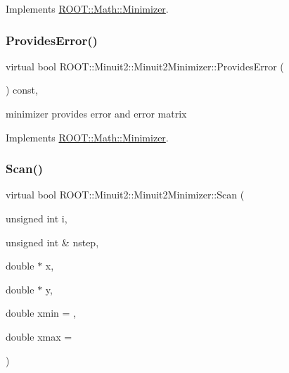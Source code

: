 Implements \mbox{\hyperlink{classROOT_1_1Math_1_1Minimizer_a71837caa295c76303c1a14679be1898d}{R\+O\+O\+T\+::\+Math\+::\+Minimizer}}.

\mbox{\label{classROOT_1_1Minuit2_1_1Minuit2Minimizer_a3a3a8abea38285fe639f2f0ec5505533}} 
\subsubsection{\texorpdfstring{ProvidesError()}{ProvidesError()}\hspace{0.1cm}{\footnotesize\ttfamily [3/3]}}
{\footnotesize\ttfamily virtual bool R\+O\+O\+T\+::\+Minuit2\+::\+Minuit2\+Minimizer\+::\+Provides\+Error (\begin{DoxyParamCaption}{ }\end{DoxyParamCaption}) const\hspace{0.3cm}{\ttfamily [inline]}, {\ttfamily [virtual]}}



minimizer provides error and error matrix 



Implements \mbox{\hyperlink{classROOT_1_1Math_1_1Minimizer_a71837caa295c76303c1a14679be1898d}{R\+O\+O\+T\+::\+Math\+::\+Minimizer}}.

\mbox{\label{classROOT_1_1Minuit2_1_1Minuit2Minimizer_a3f2f94c743a9b120a71da5ba23bd88cb}} 
\subsubsection{\texorpdfstring{Scan()}{Scan()}\hspace{0.1cm}{\footnotesize\ttfamily [1/3]}}
{\footnotesize\ttfamily virtual bool R\+O\+O\+T\+::\+Minuit2\+::\+Minuit2\+Minimizer\+::\+Scan (\begin{DoxyParamCaption}\item[{unsigned int}]{i,  }\item[{unsigned int \&}]{nstep,  }\item[{double $\ast$}]{x,  }\item[{double $\ast$}]{y,  }\item[{double}]{xmin = {},  }\item[{double}]{xmax = {} }\end{DoxyParamCaption})\hspace{0.3cm}{\ttfamily [virtual]}}

